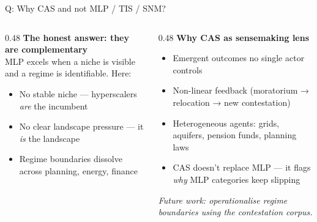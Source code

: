 \documentclass[aspectratio=169,11pt]{beamer}
\begin{document}
\appendix

\begin{frame}[noframenumbering]{\enspace Q: Why CAS and not MLP / TIS / SNM?}
\begin{columns}[T]
\begin{column}{0.48\textwidth}
  \small\textbf{The honest answer: they are complementary}\\[0.4em]
  \footnotesize
  MLP excels when a niche is visible and a regime is identifiable. Here:\\[0.3em]
  \begin{itemize}
    \item No stable niche — hyperscalers \textit{are} the incumbent
    \item No clear landscape pressure — it \textit{is} the landscape
    \item Regime boundaries dissolve across planning, energy, finance
  \end{itemize}
\end{column}
\begin{column}{0.48\textwidth}
  \small\textbf{Why CAS as sensemaking lens}\\[0.4em]
  \footnotesize
  \begin{itemize}
    \item Emergent outcomes no single actor controls
    \item Non-linear feedback (moratorium → relocation → new contestation)
    \item Heterogeneous agents: grids, aquifers, pension funds, planning laws
    \item CAS doesn't replace MLP — it flags \textit{why} MLP categories keep slipping
  \end{itemize}
  \vspace{0.3em}
  \textcolor{dcgray}{\textit{Future work: operationalise regime boundaries using the contestation corpus.}}
\end{column}
\end{columns}
\end{frame}
\end{document}
